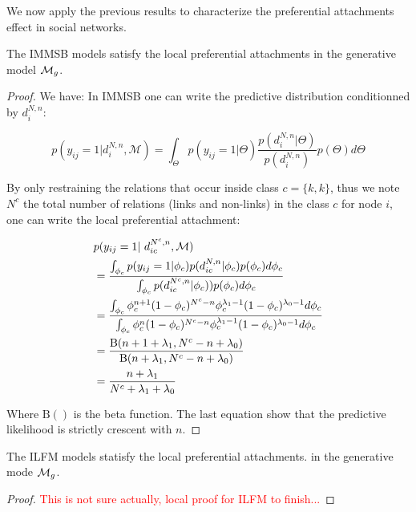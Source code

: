 We now apply the previous results to characterize the preferential attachments effect in social networks.


\begin{proposition}
	The IMMSB models satisfy the local preferential attachments in the generative model $\mathcal{M}_g$.
\end{proposition}

\begin{proof}
We have:
In IMMSB one can write the predictive distribution conditionned by $d_i^{N,n}$:

\begin{equation} 
p(y_{ij} = 1 | d_i^{N,n}, \mathcal{M}) = \int_{\Theta} p(y_{ij}=1|\Theta) \frac{p(d_i^{N,n} | \Theta)}{p(d_i^{N,n})} p(\Theta) d\Theta \nonumber
\end{equation}

By only restraining the relations that occur inside class $c=\{k,k\}$, thus we note $N^c$ the total number of relations (links and non-links) in the class $c$ for node $i$, one can write the local preferential attachment:

\begin{align*} \label{eq:sum}
&p(y_{ij} = 1 | d_{ic}^{N^c,n}, \mathcal{M})  \\
&=  \frac{ \int_{\phi_{c}} p(y_{ij}=1|\phi_{c}) p(d_{ic}^{N,n} | \phi_{c}) p(\phi_{c}) d\phi_{c}}{\int_{\phi_{c}} \p(d_{ic}^{N^c,n} | \phi_{c}))       p(\phi_{c}) d\phi_{c}}   \\
&= \frac{\int_{\phi_c} \phi_c^{n+1}(1-\phi_c)^{N^c-n} \phi_c^{\lambda_1-1} (1-\phi_c)^{\lambda_0-1} d\phi_{c}}{\int_{\phi_c} \phi_c^{n}(1-\phi_c)^{N^c-n} \phi_c^{\lambda_1-1} (1-\phi_c)^{\lambda_0-1} d\phi_{c}} \\
&= \frac{ \text{B}(n+1+\lambda_1, N^c-n+\lambda_0) }{\text{B}(n+\lambda_1, N^c-n+\lambda_0)} \\
&= \frac{n+\lambda_1}{N^c + \lambda_1 +\lambda_0}
\end{align*}

Where $\text{B}()$ is the beta function. The last equation show that the predictive likelihood is strictly crescent with $n$.


\end{proof}

\begin{proposition}
	The ILFM models statisfy the local preferential attachments. in the generative mode $\mathcal{M}_g$.
\end{proposition}
\begin{proof}
	\textcolor{red}{This is not sure actually, local proof for ILFM to finish...}
\end{proof}


